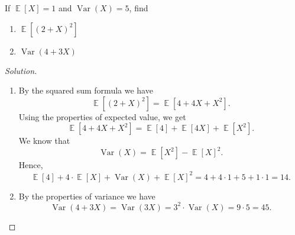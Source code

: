 \documentclass{article}[12pt]
\newenvironment{solution}
  {\renewcommand\qedsymbol{$\blacksquare$}\begin{proof}[Solution]}
  {\end{proof}}
\newenvironment{problem}[1]
  {\renewcommand\theinnercustomprblm{#1}\innercustomprblm}
  {\endinnercustomprblm}
\DeclareMathOperator{\Var}{Var}
\DeclareMathOperator{\E}{\mathbb{E}}
\begin{document}
\begin{problem}{4.38}\normalfont
If $\E[X] = 1$ and $\Var(X) = 5$, find
\begin{enumerate}[label=(\alph*)]
    \item $\E[(2 + X)^{2}]$
    \item $\Var(4 + 3X)$
\end{enumerate}
\end{problem}
\begin{solution}
\quad
\begin{enumerate}[label=(\alph*)]
    \item By the squared sum formula we have
    \begin{equation*}
        \E\left[(2 + X)^{2}\right] = \E\left[4 + 4X + X^{2}\right].
    \end{equation*}
    Using the properties of expected value, we get
    \begin{equation*}
        \E\left[4 + 4X + X^{2}\right] = \E[4] + \E[4X] + \E\left[X^{2}\right].
    \end{equation*}
    We know that
    \begin{equation*}
        \Var(X) = \E\left[X^{2}\right] - \E\left[X\right]^{2}.
    \end{equation*}
    Hence,
    \begin{equation*}
        \E[4] + 4\cdot\E[X] + \Var(X) + \E[X]^{2} = 4 + 4\cdot 1 + 5 + 1\cdot 1 = 14.
    \end{equation*}

    \item By the properties of variance we have
    \begin{equation*}
        \Var(4 + 3X) = \Var(3X) = 3^{2}\cdot\Var(X) = 9\cdot 5 = 45.
    \end{equation*}
\end{enumerate}
\end{solution}
\end{document}
